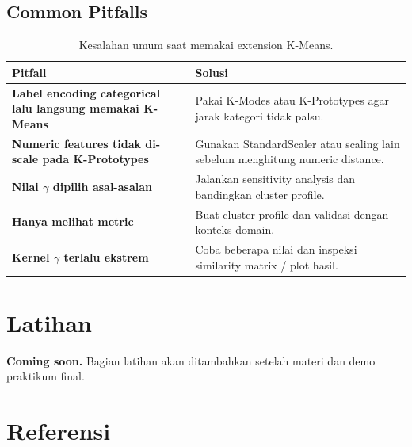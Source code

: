 \documentclass{article}
\newcommand{\infobox}[2]{%
  \par\vspace{0.6em}
  \noindent\colorbox{#1}{%
    \begin{minipage}{0.96\textwidth}
    \vspace{0.65em}
    #2
    \vspace{0.65em}
    \end{minipage}}
  \par\vspace{0.8em}
}
\begin{document}
\subsection*{Common Pitfalls}
\begin{table}[H]
\centering
{}
\begin{tabularx}{\textwidth}{>{\bfseries}XX}
\rowcolor{softOrange}
Pitfall & Solusi \\
\toprule
Label encoding categorical lalu langsung memakai K-Means & Pakai K-Modes atau K-Prototypes agar jarak kategori tidak palsu. \\
Numeric features tidak di-scale pada K-Prototypes & Gunakan StandardScaler atau scaling lain sebelum menghitung numeric distance. \\
Nilai $\gamma$ dipilih asal-asalan & Jalankan sensitivity analysis dan bandingkan cluster profile. \\
Hanya melihat metric & Buat cluster profile dan validasi dengan konteks domain. \\
Kernel $\gamma$ terlalu ekstrem & Coba beberapa nilai dan inspeksi similarity matrix / plot hasil. \\
\bottomrule
\end{tabularx}
\caption{Kesalahan umum saat memakai extension K-Means.}
\end{table}

\section{Latihan}

\infobox{softOrange}{\textbf{Coming soon.} Bagian latihan akan ditambahkan setelah materi dan demo praktikum final.}

\section*{Referensi}
\end{document}
